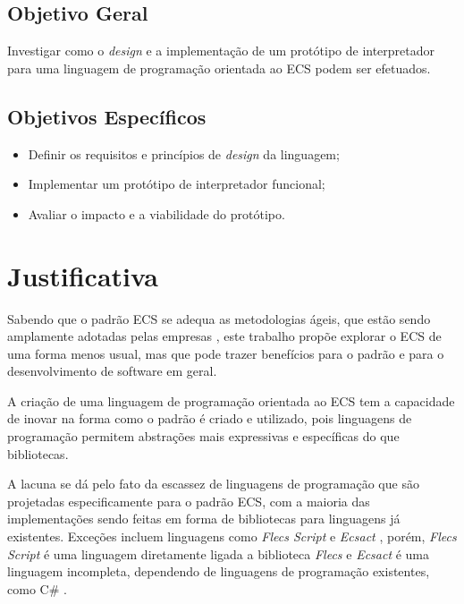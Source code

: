 \subsection{Objetivo Geral}

Investigar como o \textit{design} e a implementação de um protótipo de interpretador para uma linguagem de programação orientada ao ECS podem ser efetuados.

\subsection{Objetivos Específicos}

\begin{itemize}
    \item Definir os requisitos e princípios de \textit{design} da linguagem;
    \item Implementar um protótipo de interpretador funcional;
    \item Avaliar o impacto e a viabilidade do protótipo.
\end{itemize}

\section{Justificativa}

Sabendo que o padrão ECS se adequa as metodologias ágeis, que estão sendo amplamente adotadas pelas empresas \cite{17thstateofagile}, este trabalho propõe explorar o ECS de uma forma menos usual, mas que pode trazer benefícios para o padrão e para o desenvolvimento de software em geral.

A criação de uma linguagem de programação orientada ao ECS tem a capacidade de inovar na forma como o padrão é criado e utilizado, pois linguagens de programação permitem abstrações mais expressivas e específicas do que bibliotecas.

A lacuna se dá pelo fato da escassez de linguagens de programação que são projetadas especificamente para o padrão ECS, com a maioria das implementações sendo feitas em forma de bibliotecas para linguagens já existentes. Exceções incluem linguagens como \textit{Flecs Script} \cite{flecsscript} e \textit{Ecsact} \cite{ecsact}, porém, \textit{Flecs Script} é uma linguagem diretamente ligada a biblioteca \textit{Flecs} e \textit{Ecsact} é uma linguagem incompleta, dependendo de linguagens de programação existentes, como C\# \cite{ecsact}.
